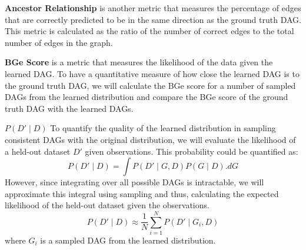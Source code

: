 \documentclass{lxaiproposal}
\begin{document}
    \vspace*{3mm}
    \textbf{Ancestor Relationship} is another metric that measures the percentage of edges that are correctly
    predicted to be in the same direction as the ground truth DAG. This metric is calculated as the ratio of the
    number of correct edges to the total number of edges in the graph.

    \vspace*{3mm}
    \textbf{BGe Score} is a metric that measures the likelihood of the data given the learned DAG. To have a
    quantitative measure of how close the learned DAG is to the ground truth DAG, we will calculate the BGe score
    for a number of sampled DAGs from the learned distribution and compare the BGe score of the ground truth DAG with
    the learned DAGs.

    \vspace*{3mm}
    \textbf{$P(D' \mid D)$} To quantify the quality of the learned distribution in sampling consistent DAGs with the
    original distribution, we will evaluate the likelihood of a held-out dataset $D'$ given observations. This
    probability could be quantified as:
    \begin{equation}
        P(D' \mid D) = \int P(D' \mid G, D) P(G \mid D). dG
        \label{eq:likelihood}
    \end{equation}
    However, since integrating over all possible DAGs is intractable, we will approximate this integral using
    sampling and thus, calculating the expected likelihood of the held-out dataset given the observations.
    \begin{equation}
        P(D' \mid D) \approx \frac{1}{N} \sum_{i=1}^{N} P(D' \mid G_i, D)
        \label{eq:approx_likelihood}
    \end{equation}
    where $G_i$ is a sampled DAG from the learned distribution.













    \pagebreak
    
    

    \makeappendix

    \appendix

\end{document}
